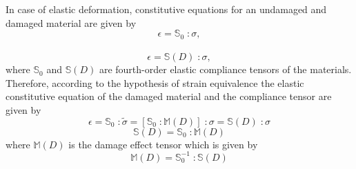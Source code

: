 \documentclass[12pt]{report}
\begin{document}
In case of elastic deformation, constitutive equations for an undamaged and damaged material are given by
\begin{equation}
\epsilon = \mathbb{S}_{0}\; : \sigma,
\end{equation}\\
\begin{equation}
\epsilon = \mathbb{S}(D)\; : \sigma,
\end{equation}
where $\mathbb{S}_{0}$ and $\mathbb{S}(D)$  are fourth-order elastic compliance tensors of the materials. Therefore, according to the hypothesis of strain equivalence the elastic constitutive equation of the damaged material and the compliance tensor are given by 
\begin{equation}
\epsilon = \mathbb{S}_{0}\; : \tilde{\sigma}  =  [\mathbb{S}_{0}\;: \mathbb{M} (D)]\;: \sigma = \mathbb{S}(D)\; : \sigma
\end{equation}
\begin{equation}
\mathbb{S}(D) = \mathbb{S}_{0}\; : \mathbb{M} (D)
 \label{eqn:S_HSeq}
\end{equation}
where $\mathbb{M} (D)$ is the damage effect tensor which is given by 
\begin{equation}
\mathbb{M} (D)  = \mathbb{S}_{0}^{-1} \; : \mathbb{S}(D) 
\end{equation}
\end{document}
